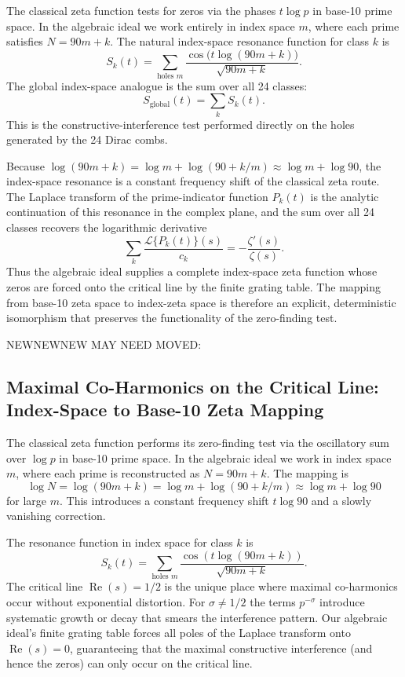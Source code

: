 \documentclass[11pt,a4paper]{article}
\begin{document}
The classical zeta function tests for zeros via the phases \(t\log p\) in base-10 prime space. In the algebraic ideal we work entirely in index space \(m\), where each prime satisfies \(N=90m+k\). The natural index-space resonance function for class \(k\) is
\[
S_k(t)=\sum_{\text{holes }m}\frac{\cos\bigl(t\log(90m+k)\bigr)}{\sqrt{90m+k}}.
\]
The global index-space analogue is the sum over all 24 classes:
\[
S_{\text{global}}(t)=\sum_k S_k(t).
\]
This is the constructive-interference test performed directly on the holes generated by the 24 Dirac combs.

Because \(\log(90m+k)=\log m+\log(90+k/m)\approx\log m+\log 90\), the index-space resonance is a constant frequency shift of the classical zeta route. The Laplace transform of the prime-indicator function \(P_k(t)\) is the analytic continuation of this resonance in the complex plane, and the sum over all 24 classes recovers the logarithmic derivative
\[
\sum_{k}\frac{\mathcal{L}\{P_k(t)\}(s)}{c_k}=-\frac{\zeta'(s)}{\zeta(s)}.
\]
Thus the algebraic ideal supplies a complete index-space zeta function whose zeros are forced onto the critical line by the finite grating table. The mapping from base-10 zeta space to index-zeta space is therefore an explicit, deterministic isomorphism that preserves the functionality of the zero-finding test.

NEWNEWNEW MAY NEED MOVED:

\subsection{Maximal Co-Harmonics on the Critical Line: Index-Space to Base-10 Zeta Mapping}

The classical zeta function performs its zero-finding test via the oscillatory sum over \(\log p\) in base-10 prime space. In the algebraic ideal we work in index space \(m\), where each prime is reconstructed as \(N=90m+k\). The mapping is
\[
\log N = \log(90m+k) = \log m + \log(90 + k/m) \approx \log m + \log 90
\]
for large \(m\). This introduces a constant frequency shift \(t\log 90\) and a slowly vanishing correction.

The resonance function in index space for class \(k\) is
\[
S_k(t)=\sum_{\text{holes }m}\frac{\cos(t\log(90m+k))}{\sqrt{90m+k}}.
\]
The critical line \(\operatorname{Re}(s)=1/2\) is the unique place where maximal co-harmonics occur without exponential distortion. For \(\sigma\neq1/2\) the terms \(p^{-\sigma}\) introduce systematic growth or decay that smears the interference pattern. Our algebraic ideal’s finite grating table forces all poles of the Laplace transform onto \(\operatorname{Re}(s)=0\), guaranteeing that the maximal constructive interference (and hence the zeros) can only occur on the critical line.
\end{document}
